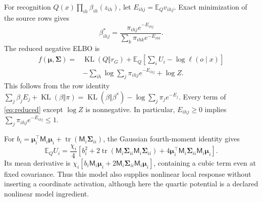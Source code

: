 \documentclass[11pt]{article}
\newcommand{\KL}{\operatorname{KL}}
\newcommand{\Tr}{\operatorname{tr}}
\newcommand{\E}{\mathbb E}
\newcommand{\m}{\boldsymbol{\mu}}
\newcommand{\Sig}{\boldsymbol{\Sigma}}
\begin{document}
For recognition $Q(x)\prod_{ih}\beta_{ih}(z_{ih})$, let $E_{ihj}=\E_Qv_{ihj}$. Exact minimization of the source rows gives
\begin{equation}
\beta_{ihj}^*=\frac{\pi_{ihj}e^{-E_{ihj}}}{\sum_k\pi_{ihk}e^{-E_{ihk}}}.
\label{eq:gibbssources}
\end{equation}
The reduced negative ELBO is
\begin{equation}
\begin{split}
f(\m,\Sig)={}&\KL(Q\Vert r_G)+\E_Q\left[\sum_iU_i-\log\ell(o\mid x)\right]\\
&-\sum_{ih}\log\sum_j\pi_{ihj}e^{-E_{ihj}}+\log Z.
\end{split}
\label{eq:reduced}
\end{equation}
This follows from the row identity $\sum_j\beta_jE_j+\KL(\beta\Vert\pi)=\KL(\beta\Vert\beta^*)-\log\sum_j\pi_je^{-E_j}$. Every term of \eqref{eq:reduced} except $\log Z$ is nonnegative. In particular, $E_{ihj}\ge0$ implies $\sum_j\pi_{ihj}e^{-E_{ihj}}\le1$.

For $b_i=\m_i^\top\mathsf M_i\m_i+\Tr(\mathsf M_i\Sig_{ii})$, the Gaussian fourth-moment identity gives
\begin{equation}
\E_QU_i=\frac{\chi_i}{4}
\left[b_i^2+2\Tr(\mathsf M_i\Sig_{ii}\mathsf M_i\Sig_{ii})
+4\m_i^\top\mathsf M_i\Sig_{ii}\mathsf M_i\m_i\right].
\label{eq:quarticmoment}
\end{equation}
Its mean derivative is $\chi_i[b_i\mathsf M_i\m_i+2\mathsf M_i\Sig_{ii}\mathsf M_i\m_i]$, containing a cubic term even at fixed covariance. Thus this model also supplies nonlinear local response without inserting a coordinate activation, although here the quartic potential is a declared nonlinear model ingredient.
\end{document}
